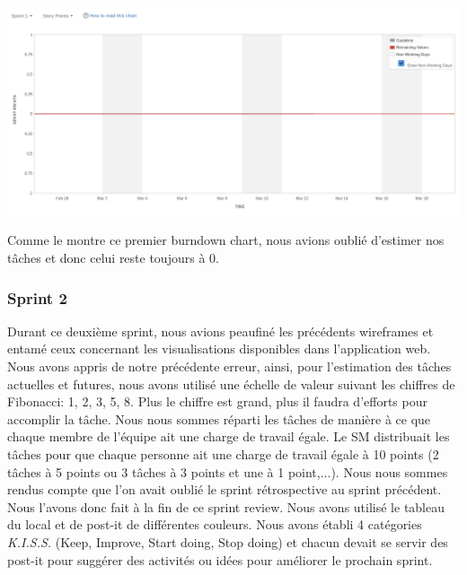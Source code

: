 \documentclass[t, 12pt, usenames,dvipsnames]{article}
\begin{document}
                
                 \begin{center}
                    \includegraphics[scale=.25]{images/graph-new/sprint1.png}
                    \label{fig:sprint1_graph}
                \end{center}
                Comme le montre ce premier burndown chart, nous avions oublié d'estimer nos tâches et donc celui reste toujours à 0.
                
                
            \subsubsection{Sprint 2}
                \noindent Durant ce deuxième sprint, nous avions peaufiné les précédents wireframes et entamé ceux concernant les visualisations disponibles dans l'application web. Nous avons appris de notre précédente erreur, ainsi, pour l'estimation des tâches actuelles et futures, nous avons utilisé une échelle de valeur suivant les chiffres de Fibonacci: 1, 2, 3, 5, 8. Plus le chiffre est grand, plus il faudra d'efforts pour accomplir la tâche. Nous nous sommes réparti les tâches de manière à ce que chaque membre de l'équipe ait une charge de travail égale. Le SM distribuait les tâches pour que chaque personne ait une charge de travail égale à 10 points (2 tâches à 5 points ou 3 tâches à 3 points et une à 1 point,...).
                \newline
                Nous nous sommes rendus compte que l'on avait oublié le sprint rétrospective au sprint précédent. Nous l'avons donc fait à la fin de ce sprint review. 
                Nous avons utilisé le tableau du local et de post-it de différentes couleurs. Nous avons établi 4 catégories \textit{K.I.S.S.} (Keep, Improve, Start doing, Stop doing) et chacun devait se servir des post-it pour suggérer des activités ou idées pour améliorer le prochain sprint.
\end{document}
